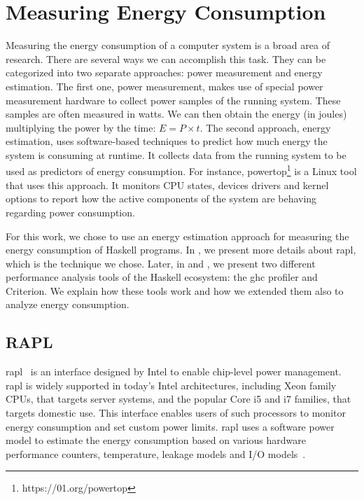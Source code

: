 \chapter{Measuring Energy Consumption}\label{chapter:tools}
Measuring the energy consumption of a computer system is a broad area of research. There are several ways we can accomplish this task. They can be categorized into two separate approaches: power measurement and energy estimation. The first one, power measurement, makes use of special power measurement hardware to collect power samples of the running system. These samples are often measured in watts. We can then obtain the energy (in joules) multiplying the power by the time: $E = P \times t$.
The second approach, energy estimation, uses software-based techniques to predict how much energy the system is consuming at runtime. It collects data from the running system to be used as predictors of energy consumption. For instance, powertop\footnote{https://01.org/powertop} is a Linux tool that uses this approach. It monitors CPU states, devices drivers and kernel options to report how the active components of the system are behaving regarding power consumption.

For this work, we chose to use an energy estimation approach for measuring the energy consumption of Haskell programs. In , we present more details about \acs{rapl}, which is the technique we chose. Later, in  and , we present two different performance analysis tools of the Haskell ecosystem: the \acs{ghc} profiler and Criterion. We explain how these tools work and how we extended them also to analyze energy consumption.

\section{RAPL}\label{sec:rapl}
\ac{rapl}~\citep{david:2010} is an interface designed by Intel to enable chip-level power management. \acs{rapl} is widely supported in today's Intel architectures, including Xeon family CPUs, that targets server systems, and the popular Core i5 and i7 families, that targets domestic use. This interface enables users of such processors to monitor energy consumption and set custom
power limits. \acs{rapl} uses a software power model to estimate the energy consumption based on various hardware performance counters, temperature, leakage models and I/O models~\citep{weaver:2012}.

